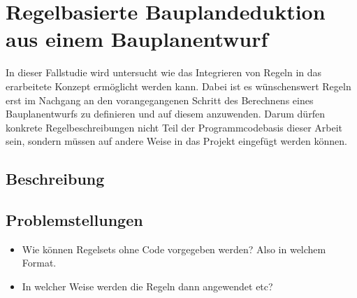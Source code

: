 \section{Regelbasierte Bauplandeduktion aus einem Bauplanentwurf}\label{scenarios:scenario4}
In dieser Fallstudie wird untersucht wie das Integrieren von Regeln in das erarbeitete Konzept ermöglicht werden kann.
Dabei ist es wünschenswert Regeln erst im Nachgang an den vorangegangenen Schritt des Berechnens eines Bauplanentwurfs zu definieren und auf diesem anzuwenden.
Darum dürfen konkrete Regelbeschreibungen nicht Teil der Programmcodebasis dieser Arbeit sein, sondern müssen auf andere Weise in das Projekt eingefügt werden können.

\subsection*{Beschreibung}
\subsection*{Problemstellungen}
\begin{itemize}
  \item Wie können Regelsets ohne Code vorgegeben werden? Also in welchem Format.
  \item In welcher Weise werden die Regeln dann angewendet etc?
\end{itemize}